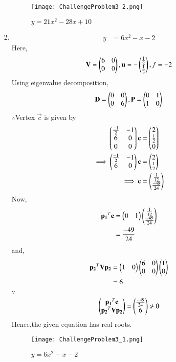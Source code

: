 \documentclass[journal,12pt,twocolumn]{IEEEtran}
\begin{document}
\begin{enumerate}
    \begin{figure}[!ht]
    \centering
    \texttt{[image: ChallengeProblem3\_2.png]}
    \caption{$y=21x^2-28x+10$}
    \label{ex1}	
    \end{figure}
    
    \item
    \begin{align}
        y &= 6x^2-x-2
    \end{align}
    Here,
    \begin{align}
        \mathbf{V} = \begin{pmatrix}6 & 0 \\ 0 & 0\end{pmatrix},\mathbf{u}=-\begin{pmatrix}\frac{1}{2} \\ \frac{1}{2}\end{pmatrix},f=-2
    \end{align}
    Using eigenvalue decomposition,
    \begin{align}
        \mathbf{D} = \begin{pmatrix}0 & 0\\0 & 6\end{pmatrix} ,\mathbf{P}=\begin{pmatrix}0 & 1\\1 & 0\end{pmatrix}
    \end{align}
    $\therefore$Vertex $\vec{c}$ is given by
    \begin{align}
        \begin{pmatrix}\frac{-1}{2} & -1 \\ 6 & 0 \\ 0 & 0\end{pmatrix}\mathbf{c} &= \begin{pmatrix}2 \\ \frac{1}{2} \\ 0\end{pmatrix} \\
        \implies  \begin{pmatrix}\frac{-1}{2} & -1 \\ 6 & 0\end{pmatrix}\mathbf{c} &= \begin{pmatrix}2 \\ \frac{1}{2}\end{pmatrix}
        \\
        \implies \mathbf{c} &= \begin{pmatrix}\frac{1}{12} \\ \frac{-49}{24}\end{pmatrix}
    \end{align}
    Now,
    \begin{align}
        \mathbf{p_1}^T\mathbf{c} &= \begin{pmatrix}0 & 1\end{pmatrix}\begin{pmatrix}\frac{1}{12} \\ \frac{-49}{24}\end{pmatrix}
        \\
        &= \frac{-49}{24}
    \end{align}
    and,
    \begin{align}
        \mathbf{p_2}^T\mathbf{V}\mathbf{p_2} &= \begin{pmatrix}1 & 0\end{pmatrix}\begin{pmatrix}6 & 0\\0& 0\end{pmatrix}\begin{pmatrix}1 \\ 0\end{pmatrix}
        \\
        &= 6
    \end{align}
    $\because$
    \begin{align}
    \begin{pmatrix}\mathbf{p_1}^T\mathbf{c} \\ \mathbf{p_2}^T\mathbf{V}\mathbf{p_2}\end{pmatrix} = \begin{pmatrix}\frac{-49}{24} \\ 6\end{pmatrix} \nsucc 0
    \end{align}
    Hence,the given equation has real roots.
    
    \begin{figure}[!ht]
    \centering
    \texttt{[image: ChallengeProblem3\_1.png]}
    \caption{$y=6x^2-x-2$}
    \label{ex2}	
    \end{figure}

\end{enumerate}
\end{document}
